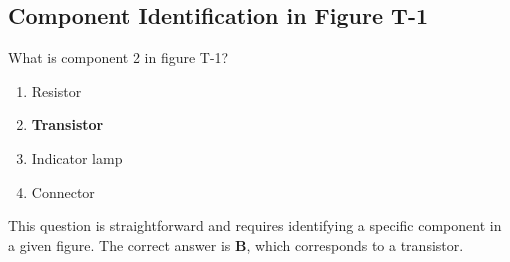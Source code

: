 \subsection{Component Identification in Figure T-1}
\label{T6C03}

\begin{tcolorbox}[colback=gray!10!white,colframe=black!75!black,title=T6C03]
What is component 2 in figure T-1?
\begin{enumerate}[noitemsep]
    \item Resistor
    \item \textbf{Transistor}
    \item Indicator lamp
    \item Connector
\end{enumerate}
\end{tcolorbox}

This question is straightforward and requires identifying a specific component in a given figure. The correct answer is \textbf{B}, which corresponds to a transistor. 

